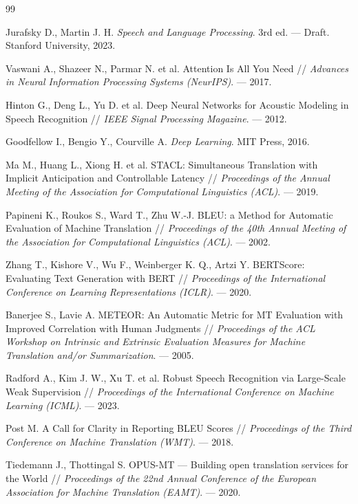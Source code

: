 
\begin{thebibliography}{99}

Jurafsky D., Martin J. H.
\textit{Speech and Language Processing}.
3rd ed. --- Draft. Stanford University, 2023.

Vaswani A., Shazeer N., Parmar N. et al.
Attention Is All You Need //
\textit{Advances in Neural Information Processing Systems (NeurIPS)}. --- 2017.

Hinton G., Deng L., Yu D. et al.
Deep Neural Networks for Acoustic Modeling in Speech Recognition //
\textit{IEEE Signal Processing Magazine}. --- 2012.

Goodfellow I., Bengio Y., Courville A.
\textit{Deep Learning}.
MIT Press, 2016.

Ma M., Huang L., Xiong H. et al.
STACL: Simultaneous Translation with Implicit Anticipation and Controllable
Latency //
\textit{Proceedings of the Annual Meeting of the Association for Computational
Linguistics (ACL)}. --- 2019.

Papineni K., Roukos S., Ward T., Zhu W.-J.
BLEU: a Method for Automatic Evaluation of Machine Translation //
\textit{Proceedings of the 40th Annual Meeting of the Association for Computational
Linguistics (ACL)}. --- 2002.

Zhang T., Kishore V., Wu F., Weinberger K. Q., Artzi Y.
BERTScore: Evaluating Text Generation with BERT //
\textit{Proceedings of the International Conference on Learning Representations
(ICLR)}. --- 2020.

Banerjee S., Lavie A.
METEOR: An Automatic Metric for MT Evaluation with Improved Correlation with
Human Judgments //
\textit{Proceedings of the ACL Workshop on Intrinsic and Extrinsic Evaluation
Measures for Machine Translation and/or Summarization}. --- 2005.

Radford A., Kim J. W., Xu T. et al.
Robust Speech Recognition via Large-Scale Weak Supervision //
\textit{Proceedings of the International Conference on Machine Learning
(ICML)}. --- 2023.

Post M.
A Call for Clarity in Reporting BLEU Scores //
\textit{Proceedings of the Third Conference on Machine Translation (WMT)}. --- 2018.

Tiedemann J., Thottingal S.
OPUS-MT --- Building open translation services for the World //
\textit{Proceedings of the 22nd Annual Conference of the European Association
for Machine Translation (EAMT)}. --- 2020.


\end{thebibliography}
